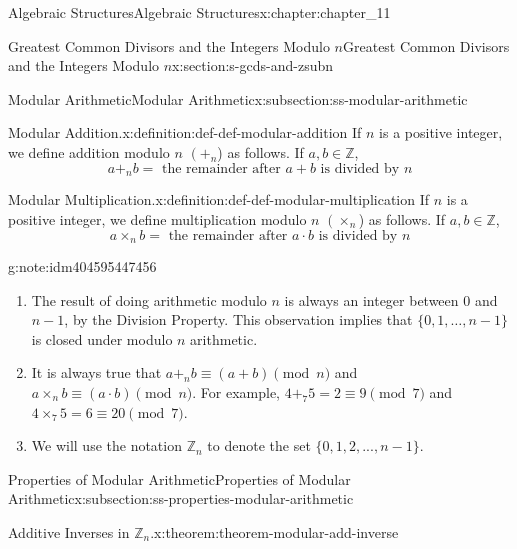\documentclass[twoside,10pt,]{book}
\numberwithin{equation}{section}
\begin{document}
\begin{chapterptx}{Algebraic Structures}{}{Algebraic Structures}{}{}{x:chapter:chapter_11}
\begin{sectionptx}{Greatest Common Divisors  and the Integers Modulo \(n\)}{}{Greatest Common Divisors  and the Integers Modulo \(n\)}{}{}{x:section:s-gcds-and-zsubn}
\begin{subsectionptx}{Modular Arithmetic}{}{Modular Arithmetic}{}{}{x:subsection:ss-modular-arithmetic}
\begin{definition}{Modular Addition.}{x:definition:def-def-modular-addition}%
%
\label{g:notation:idm404595434352}%
If \(n\) is a positive integer, we define addition modulo \(n\) \(\left(+_n\right.\)) as follows. If \(a, b \in  \mathbb{Z}\),%
\begin{equation*}
a +_n b = \textrm{ the remainder after } a + b \textrm{ is divided by } n
\end{equation*}
%
\end{definition}
\begin{definition}{Modular Multiplication.}{x:definition:def-def-modular-multiplication}%
%
\label{g:notation:idm404595452368}%
If \(n\) is a positive integer, we define  multiplication modulo \(n\) \(\left(\times_n\right.\)) as follows. If \(a, b \in  \mathbb{Z}\),%
\begin{equation*}
a \times_n b = \textrm{ the remainder after } a \cdot b \textrm{ is divided by } n
\end{equation*}
%
\end{definition}
\begin{note}{}{g:note:idm404595447456}%
%
\begin{enumerate}[label=(\alph*)]
\item{}The result of doing arithmetic modulo \(n\) is always an integer between 0 and \(n-1\), by the Division Property. This observation implies that \(\{0, 1,\dots, n-1\}\) is closed under modulo \(n\) arithmetic.%
\item{}It is always true that \(a +_n b \equiv  (a + b) \pmod{n}\) and \(a\times_n b \equiv  (a \cdot  b) \pmod{n}\).   For example, \(4 +_7 5 = 2 \equiv  9 \pmod{7}\) and \(4 \times_7  5 =  6 \equiv  20 \pmod{7}\).%
\item{}We will use the notation \(\mathbb{Z}_n\) to denote the set \(\{0, 1, 2,. . ., n-1\}\).%
\end{enumerate}
%
\end{note}
\end{subsectionptx}
%
%
\typeout{************************************************}
\typeout{************************************************}
%
\begin{subsectionptx}{Properties of Modular Arithmetic}{}{Properties of Modular Arithmetic}{}{}{x:subsection:ss-properties-modular-arithmetic}
%
\begin{theorem}{Additive Inverses in \(\mathbb{Z}_n\).}{}{x:theorem:theorem-modular-add-inverse}%

\end{theorem}
\end{subsectionptx}
\end{sectionptx}
\end{chapterptx}
\end{document}
